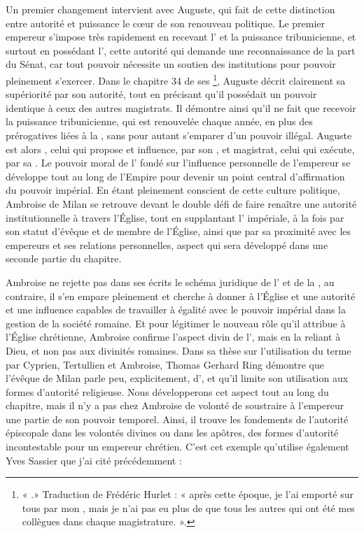 Un premier changement intervient avec Auguste, qui fait de cette distinction entre autorité et puissance le cœur de son renouveau politique. Le premier empereur s’impose très rapidement en recevant l' et la puissance tribunicienne, et surtout en possédant l’, cette autorité qui demande une reconnaissance de la part du Sénat, car tout pouvoir nécessite un soutien des institutions pour pouvoir pleinement s'exercer. Dans le chapitre 34 de ses \footnote{« .» {Traduction de Frédéric Hurlet : « après cette époque, je l’ai emporté sur tous par mon , mais je n’ai pas eu plus de  que tous les autres qui ont été mes collègues dans chaque magistrature. »}.}, Auguste décrit clairement sa supériorité par son autorité, tout en précisant qu’il possédait un pouvoir identique à ceux des autres magistrats. Il démontre ainsi qu'il ne fait que recevoir la puissance tribunicienne, qui est renouvelée chaque année, en plus des prérogatives liées à la , sans pour autant s'emparer d'un pouvoir illégal. Auguste est alors , celui qui propose et influence, par son , et magistrat, celui qui exécute, par sa \autocite{magdelain_auctoritas}. Le pouvoir moral de l' fondé sur l’influence personnelle de l’empereur se développe tout au long de l’Empire pour devenir un point central d'affirmation du pouvoir impérial. En étant pleinement conscient de cette culture politique, Ambroise de Milan se retrouve devant le double défi de faire renaître une autorité institutionnelle à travers l’Église, tout en supplantant l’ impériale, à la fois par son statut d’évêque et de membre de l’Église, ainsi que par sa proximité avec les empereurs et ses relations personnelles, aspect qui sera développé dans une seconde partie du chapitre.

\bigskip

Ambroise ne rejette pas dans ses écrits le schéma juridique de l’ et de la , au contraire, il s’en empare pleinement et cherche à donner à l’Église et une autorité et une influence capables de travailler à égalité avec le pouvoir impérial dans la gestion de la société romaine. Et pour légitimer le nouveau rôle qu’il attribue à l’Église chrétienne, Ambroise confirme l'aspect divin de l’, mais en la reliant à Dieu, et non pas aux divinités romaines. Dans sa thèse sur l’utilisation du terme  par Cyprien, Tertullien et Ambroise\autocite{ring_auctoritas}, Thomas Gerhard Ring démontre que l’évêque de Milan parle peu, explicitement, d’, et qu’il limite son utilisation aux formes d’autorité religieuse. Nous développerons cet aspect tout au long du chapitre, mais il n’y a pas chez Ambroise de volonté de soustraire à l’empereur une partie de son pouvoir temporel. Ainsi, il trouve les fondements de l’autorité épiscopale dans les volontés divines ou dans les apôtres, des formes d’autorité incontestable pour un empereur chrétien. C’est cet exemple qu’utilise également Yves Sassier que j’ai cité précédemment :


